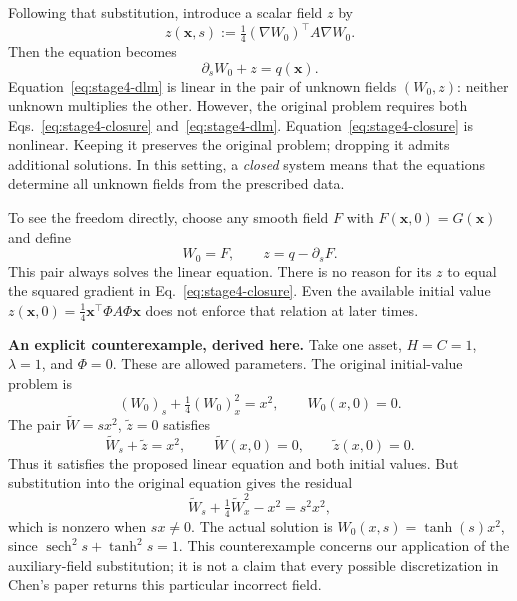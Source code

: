 \documentclass[11pt,a4paper]{article}
\begin{document}
Following that substitution, introduce a scalar field $z$ by
\begin{equation}
 z(\mathbf x,s):=\tfrac14(\nabla W_0)^\top A\nabla W_0.
 \label{eq:stage4-closure}
\end{equation}
Then the equation becomes
\begin{equation}
 \boxed{\partial_sW_0+z=q(\mathbf x).}
 \label{eq:stage4-dlm}
\end{equation}
Equation~\eqref{eq:stage4-dlm} is linear in the pair of unknown fields
$(W_0,z)$: neither unknown multiplies the other. However, the original
problem requires both Eqs.~\eqref{eq:stage4-closure}
and~\eqref{eq:stage4-dlm}. Equation~\eqref{eq:stage4-closure} is nonlinear.
Keeping it preserves the original problem; dropping it admits additional
solutions. In this setting, a \emph{closed} system means that the equations
determine all unknown fields from the prescribed data.

To see the freedom directly, choose any smooth field $F$ with
$F(\mathbf x,0)=G(\mathbf x)$ and define
\[
 W_0=F,\qquad z=q-\partial_sF.
\]
This pair always solves the linear equation. There is no reason for its
$z$ to equal the squared gradient in Eq.~\eqref{eq:stage4-closure}.
Even the available initial value
$z(\mathbf x,0)=\tfrac14\mathbf x^\top\Phi A\Phi\mathbf x$
does not enforce that relation at later times.

\textbf{An explicit counterexample, derived here.}
Take one asset, $H=C=1$, $\lambda=1$, and $\Phi=0$. These are allowed
parameters. The original initial-value problem is
\[
 (W_0)_s+\tfrac14(W_0)_x^2=x^2,\qquad W_0(x,0)=0.
\]
The pair $\widetilde W=sx^2$, $\widetilde z=0$ satisfies
\[
 \widetilde W_s+\widetilde z=x^2,\qquad
 \widetilde W(x,0)=0,\qquad\widetilde z(x,0)=0.
\]
Thus it satisfies the proposed linear equation and both initial values.
But substitution into the original equation gives the residual
\begin{equation}
 \widetilde W_s+\tfrac14\widetilde W_x^2-x^2=s^2x^2,
 \label{eq:stage4-counterexample}
\end{equation}
which is nonzero when $s x\ne0$. The actual solution is
$W_0(x,s)=\tanh(s)x^2$, since
$\operatorname{sech}^2s+\tanh^2s=1$.
This counterexample concerns our application of the auxiliary-field
substitution; it is not a claim that every possible discretization in
Chen's paper returns this particular incorrect field.
\end{document}
